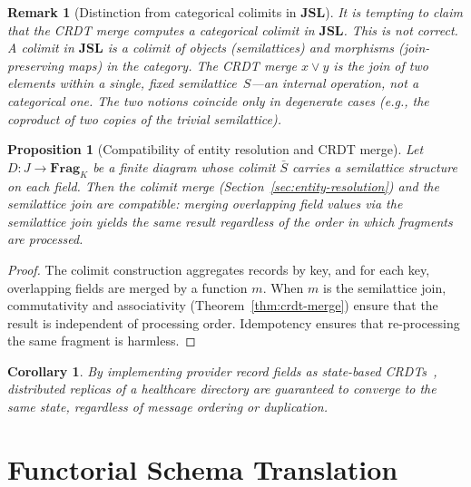 \documentclass[11pt,a4paper]{article}
\newtheorem{proposition}[definition]{Proposition}
\newtheorem{corollary}[definition]{Corollary}
\newtheorem{remark}[definition]{Remark}
\begin{document}
\begin{remark}[Distinction from categorical colimits in $\mathbf{JSL}$]
\label{rem:not-colimit}
It is tempting to claim that the CRDT merge computes a categorical
colimit in $\mathbf{JSL}$. This is \emph{not} correct. A colimit in
$\mathbf{JSL}$ is a colimit of \emph{objects} (semilattices) and
\emph{morphisms} (join-preserving maps) in the category. The CRDT merge
$x\vee y$ is the join of two \emph{elements within a single, fixed
semilattice}~$S$---an internal operation, not a categorical one. The two
notions coincide only in degenerate cases (e.g., the coproduct of two
copies of the trivial semilattice).
\end{remark}

\begin{proposition}[Compatibility of entity resolution and CRDT merge]
\label{prop:compatibility}
Let $D:J\to\mathbf{Frag}_K$ be a finite diagram whose colimit
$\bar{S}$ carries a semilattice structure on each field. Then the
colimit merge (Section~\ref{sec:entity-resolution}) and the
semilattice join are compatible: merging overlapping field values via
the semilattice join yields the same result regardless of the order in
which fragments are processed.
\end{proposition}

\begin{proof}
The colimit construction aggregates records by key, and for each key,
overlapping fields are merged by a function $m$. When $m$ is the
semilattice join, commutativity and associativity (Theorem~\ref{thm:crdt-merge})
ensure that the result is independent of processing order. Idempotency
ensures that re-processing the same fragment is harmless.
\end{proof}

\begin{corollary}
\label{cor:crdt-convergence}
By implementing provider record fields as state-based
CRDTs~\citep{shapiro2011,preguica2018}, distributed replicas of a
healthcare directory are guaranteed to converge to the same state,
regardless of message ordering or duplication.
\end{corollary}

\section{Functorial Schema Translation}
\label{sec:schema}
\end{document}
